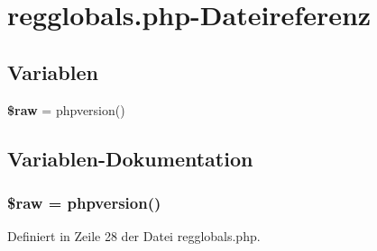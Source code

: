 \section{regglobals.php-Dateireferenz}
\label{regglobals_8php}
\subsection*{Variablen}
\begin{CompactItemize}
\item 
{\bf \$raw} = phpversion()
\end{CompactItemize}


\subsection{Variablen-Dokumentation}
\subsubsection{\setlength{\rightskip}{0pt plus 5cm}\$raw = phpversion()}\label{regglobals_8php_d2850dbb22c3d9922e340365d5b10f5f}




Definiert in Zeile 28 der Datei regglobals.php.